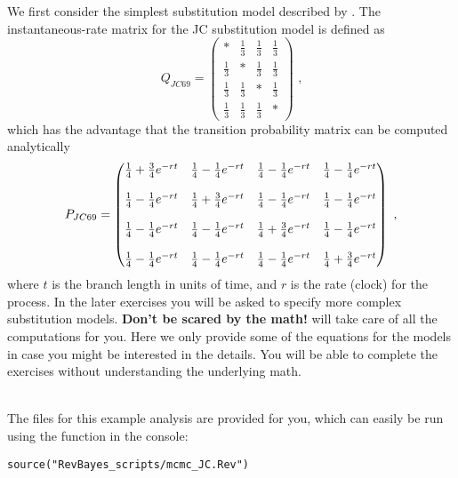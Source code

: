 We first consider the simplest substitution model described by \cite{Jukes1969}.
The instantaneous-rate matrix for the JC substitution model is defined as
\begin{equation*}
Q_{JC69} = \begin{pmatrix} 
{*} & \frac{1}{3} & \frac{1}{3} & \frac{1}{3} \\ 
\frac{1}{3} & {*} & \frac{1}{3} & \frac{1}{3} \\ 
\frac{1}{3} & \frac{1}{3} & {*} & \frac{1}{3} \\ 
\frac{1}{3} & \frac{1}{3} & \frac{1}{3} & {*}  
\end{pmatrix} \mbox{  ,}
\end{equation*}
which has the advantage that the transition probability matrix can be computed analytically
\begin{equation*}
P_{JC69} = \begin{pmatrix} {{1\over4} + {3\over4}e^{-rt}} & {{1\over4} - {1\over4}e^{-rt}} & {{1\over4} - {1\over4}e^{-rt}} & {{1\over4} - {1\over4}e^{-rt}} \\\\ {{1\over4} - {1\over4}e^{-rt}} & {{1\over4} + {3\over4}e^{-rt}} & {{1\over4} - {1\over4}e^{-rt}} & {{1\over4} - {1\over4}e^{-rt}} \\\\ {{1\over4} - {1\over4}e^{-rt}} & {{1\over4} - {1\over4}e^{-rt}} & {{1\over4} + {3\over4}e^{-rt}} & {{1\over4} - {1\over4}e^{-rt}} \\\\ {{1\over4} - {1\over4}e^{-rt}} & {{1\over4} - {1\over4}e^{-rt}} & {{1\over4} - {1\over4}e^{-rt}} & {{1\over4} + {3\over4}e^{-rt}}  
\end{pmatrix} \mbox{  ,}
\end{equation*}
where $t$ is the branch length in units of time, and $r$ is the rate (clock) for the process.
In the later exercises you will be asked to specify more complex substitution models.
\textbf{Don't be scared by the math!}
\RevBayes will take care of all the computations for you.
Here we only provide some of the equations for the models in case you might be interested in the details.
You will be able to complete the exercises without understanding the underlying math.


\noindent \\ \impmark The files for this example analysis are provided for you, which can easily be run using the  function in the \RevBayes console:
{\tt \begin{snugshade*}
\begin{lstlisting}
source("RevBayes_scripts/mcmc_JC.Rev")
\end{lstlisting}
\end{snugshade*}}

